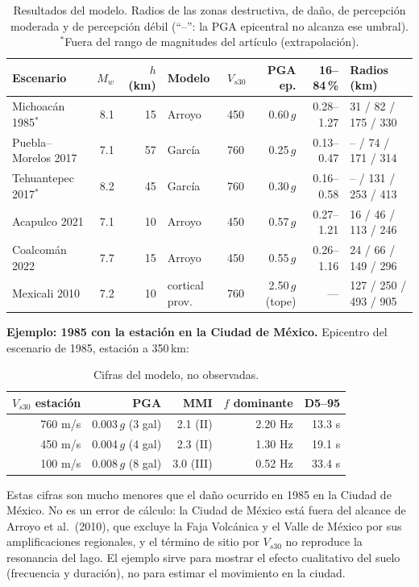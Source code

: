 \documentclass[11pt,a4paper]{article}
\begin{document}
\begin{table}[h]
\centering
\footnotesize
\setlength{\tabcolsep}{3pt}
\begin{tabular}{lrrllrrl}
\toprule
Escenario & $M_w$ & $h$ (km) & Modelo & $V_{s30}$ & PGA ep. & 16--84\,\% & Radios (km) \\
\midrule
Michoacán 1985$^\ast$ & 8.1 & 15 & Arroyo & 450 & 0.60\,$g$ & 0.28--1.27 & 31 / 82 / 175 / 330 \\
Puebla--Morelos 2017 & 7.1 & 57 & García & 760 & 0.25\,$g$ & 0.13--0.47 & -- / 74 / 171 / 314 \\
Tehuantepec 2017$^\ast$ & 8.2 & 45 & García & 760 & 0.30\,$g$ & 0.16--0.58 & -- / 131 / 253 / 413 \\
Acapulco 2021 & 7.1 & 10 & Arroyo & 450 & 0.57\,$g$ & 0.27--1.21 & 16 / 46 / 113 / 246 \\
Coalcomán 2022 & 7.7 & 15 & Arroyo & 450 & 0.55\,$g$ & 0.26--1.16 & 24 / 66 / 149 / 296 \\
Mexicali 2010 & 7.2 & 10 & cortical prov. & 760 & 2.50\,$g$ (tope) & --- & 127 / 250 / 493 / 905 \\
\bottomrule
\end{tabular}
\caption{Resultados del modelo. Radios de las zonas destructiva, de daño, de percepción moderada y de
percepción débil (``--'': la PGA epicentral no alcanza ese umbral). $^\ast$Fuera del rango de magnitudes
del artículo (extrapolación).}
\label{tab:escenarios}
\end{table}

\textbf{Ejemplo: 1985 con la estación en la Ciudad de México.} Epicentro del escenario de 1985,
estación a 350\,km:

\begin{table}[h]
\centering
\begin{tabular}{rrrrr}
\toprule
$V_{s30}$ estación & PGA & MMI & $f$ dominante & D5--95 \\
\midrule
760 m/s & 0.003\,$g$ (3 gal) & 2.1 (II) & 2.20 Hz & 13.3 s \\
450 m/s & 0.004\,$g$ (4 gal) & 2.3 (II) & 1.30 Hz & 19.1 s \\
100 m/s & 0.008\,$g$ (8 gal) & 3.0 (III) & 0.52 Hz & 33.4 s \\
\bottomrule
\end{tabular}
\caption{Cifras del modelo, no observadas.}
\end{table}

Estas cifras son mucho menores que el daño ocurrido en 1985 en la Ciudad de México. No es un error de
cálculo: la Ciudad de México está fuera del alcance de Arroyo et al.\ (2010), que excluye la Faja
Volcánica y el Valle de México por sus amplificaciones regionales, y el término de sitio por $V_{s30}$
no reproduce la resonancia del lago. El ejemplo sirve para mostrar el efecto cualitativo del suelo
(frecuencia y duración), no para estimar el movimiento en la ciudad.
\end{document}
